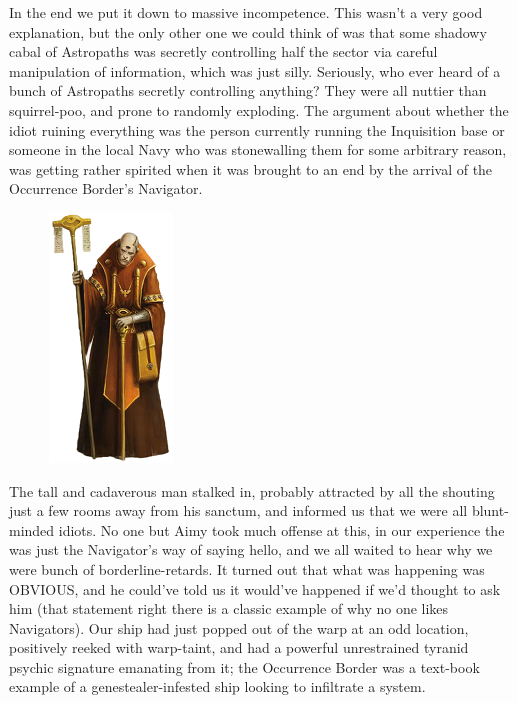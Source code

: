 In the end we put it down to massive incompetence. 
This wasn't a very good explanation, but the only other one we could think of was that some shadowy cabal of Astropaths was secretly controlling half the sector via careful manipulation of information, which was just silly. 
Seriously, who ever heard of a bunch of Astropaths secretly controlling anything? 
They were all nuttier than squirrel-poo, and prone to randomly exploding. 
The argument about whether the idiot ruining everything was the person currently running the Inquisition base or someone in the local Navy who was stonewalling them for some arbitrary reason, was getting rather spirited when it was brought to an end by the arrival of the Occurrence Border's Navigator.

\begin{figure}
	\begin{center}
		\includegraphics[width=\figwidth]{pics/15/28.png}
	\end{center}
\end{figure}
The tall and cadaverous man stalked in, probably attracted by all the shouting just a few rooms away from his sanctum, and informed us that we were all blunt-minded idiots. 
No one but Aimy took much offense at this, in our experience the was just the Navigator's way of saying hello, and we all waited to hear why we were bunch of borderline-retards. 
It turned out that what was happening was OBVIOUS, and he could've told us it would've happened if we'd thought to ask him (that statement right there is a classic example of why no one likes Navigators). 
Our ship had just popped out of the warp at an odd location, positively reeked with warp-taint, and had a powerful unrestrained tyranid psychic signature emanating from it; 
the Occurrence Border was a text-book example of a genestealer-infested ship looking to infiltrate a system.

